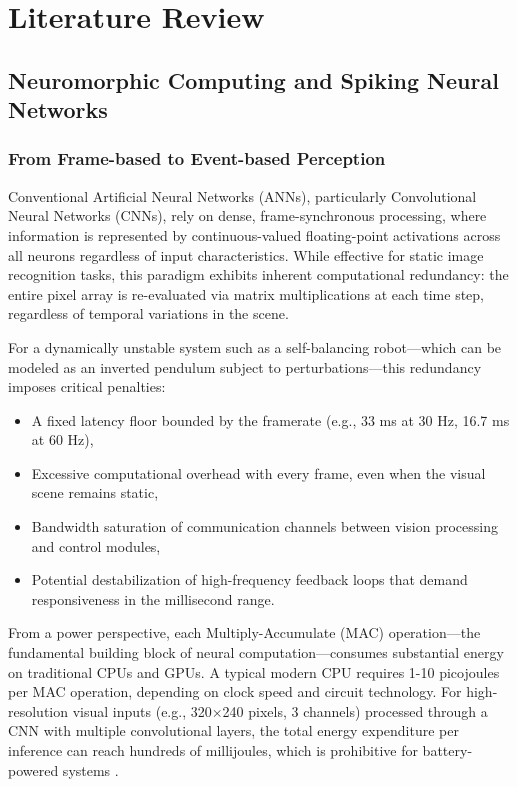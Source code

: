 \newpage
\section{Literature Review}



\subsection{Neuromorphic Computing and Spiking Neural Networks}

\subsubsection{From Frame-based to Event-based Perception}

Conventional Artificial Neural Networks (ANNs), particularly Convolutional Neural Networks (CNNs), 
rely on dense, frame-synchronous processing, where information is represented by continuous-valued 
floating-point activations across all neurons regardless of input characteristics. While effective 
for static image recognition tasks, this paradigm exhibits inherent computational redundancy: 
the entire pixel array is re-evaluated via matrix multiplications at each time step, regardless 
of temporal variations in the scene. 

For a dynamically unstable system such as a self-balancing robot—which can be modeled as an inverted 
pendulum subject to perturbations—this redundancy imposes critical penalties:
\begin{itemize}
    \item A fixed latency floor bounded by the framerate (e.g., 33 ms at 30 Hz, 16.7 ms at 60 Hz),
    \item Excessive computational overhead with every frame, even when the visual scene remains static,
    \item Bandwidth saturation of communication channels between vision processing and control modules,
    \item Potential destabilization of high-frequency feedback loops that demand responsiveness in the 
    millisecond range.
\end{itemize}

From a power perspective, each Multiply-Accumulate (MAC) operation—the fundamental building block 
of neural computation—consumes substantial energy on traditional CPUs and GPUs. A typical modern 
CPU requires 1-10 picojoules per MAC operation, depending on clock speed and circuit technology. 
For high-resolution visual inputs (e.g., 320×240 pixels, 3 channels) processed through a CNN with 
multiple convolutional layers, the total energy expenditure per inference can reach hundreds of 
millijoules, which is prohibitive for battery-powered systems \cite{gallego2020event}.


